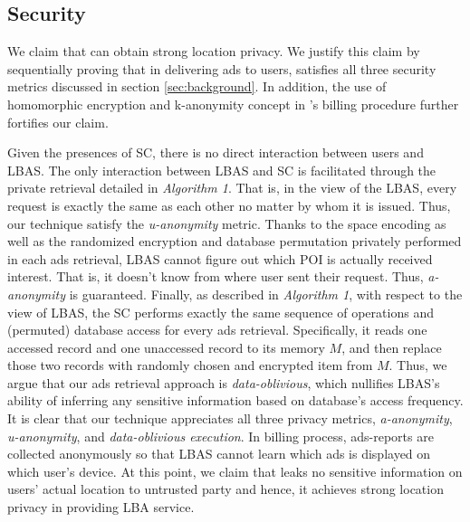 



\subsection{Security}
We claim that \codename can obtain strong location privacy. We justify this claim by sequentially proving that in delivering ads to users, \codename satisfies all three security metrics discussed in section \ref{sec:background}. In addition, the use of homomorphic encryption and k-anonymity concept in \codename 's billing procedure further fortifies our claim.

Given the presences of SC, there is no direct interaction between users and LBAS. The only interaction between LBAS and SC is facilitated through the private retrieval detailed in \textit{Algorithm 1}. That is, in the view of the LBAS, every request is exactly the same as each other no matter by whom it is issued. Thus, our technique satisfy the \textit{u-anonymity} metric.
Thanks to the space encoding as well as the randomized encryption and database permutation privately performed in each ads retrieval, LBAS cannot figure out which POI is actually received interest. That is, it doesn't know from where user sent their request. Thus, \textit{a-anonymity} is guaranteed. 
Finally, as described in \textit{Algorithm 1}, with respect to the view of LBAS, the SC performs exactly the same sequence of operations and (permuted) database access for every ads retrieval. Specifically, it reads one accessed record and one unaccessed record to its memory $M$, and then replace those two records with randomly chosen and encrypted item from $M$. Thus, we argue that our ads retrieval approach is \textit{data-oblivious}, which nullifies LBAS's ability of inferring any sensitive information based on database's access frequency. It is clear that our technique appreciates all three privacy metrics, \textit{a-anonymity}, \textit{u-anonymity}, and \textit{data-oblivious execution}.  In billing process, ads-reports are collected anonymously so that LBAS cannot learn which ads is displayed on which user's device. At this point, we claim that \codename leaks no sensitive information on users' actual location to untrusted party and hence, it achieves strong location privacy in providing LBA service.
